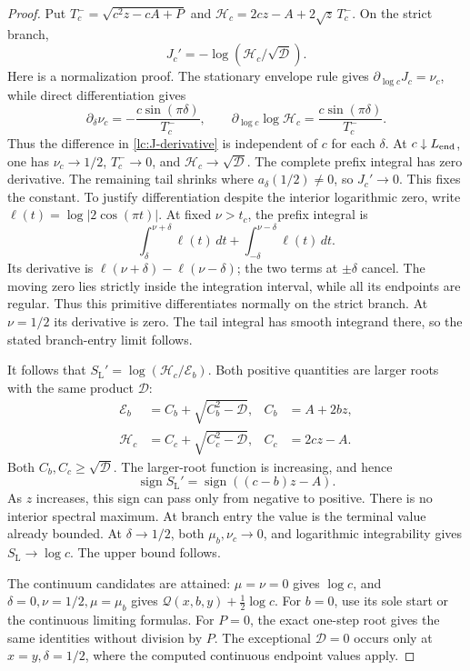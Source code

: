\documentclass[11pt]{article}
\numberwithin{equation}{section}
\theoremstyle{remark}\newtheorem{remark}[theorem]{Remark}
\begin{document}
\begin{proof}
Put \(T_c^-=\sqrt{c^2z-cA+P}\) and
\(\mathcal H_c=2cz-A+2\sqrt z\,T_c^-\). On the strict branch,
\begin{equation}\label{lc:J-derivative}
                  J_c'=-\log(\mathcal H_c/\sqrt{\mathcal D}).
\end{equation}
Here is a normalization proof. The stationary envelope rule gives
\(\partial_{\log c}J_c=\nu_c\), while direct differentiation gives
\[
 \partial_\delta\nu_c=-\frac{c\sin(\pi\delta)}{T_c^-},\qquad
 \partial_{\log c}\log\mathcal H_c=
                         \frac{c\sin(\pi\delta)}{T_c^-}.
\]
Thus the difference in \eqref{lc:J-derivative} is independent of
\(c\) for each \(\delta\). At \(c\downarrow L_{\rm end}\), one has
\(\nu_c\to1/2\), \(T_c^-\to0\), and \(\mathcal H_c\to\sqrt{\mathcal D}\).
The complete prefix integral has zero derivative. The remaining
tail shrinks where \(a_\delta(1/2)\ne0\), so \(J_c'\to0\).
This fixes the constant. To justify differentiation despite the
interior logarithmic zero, write \(\ell(t)=\log|2\cos(\pi t)|\).
At fixed \(\nu>t_c\), the prefix integral is
\[
 \int_\delta^{\nu+\delta}\ell(t)\,dt+
 \int_{-\delta}^{\nu-\delta}\ell(t)\,dt.
\]
Its derivative is
\(\ell(\nu+\delta)-\ell(\nu-\delta)\); the two terms at
\(\pm\delta\) cancel. The moving zero lies strictly inside the
integration interval, while all its endpoints are regular.
Thus this primitive differentiates normally on the strict branch.
At \(\nu=1/2\) its derivative is zero. The tail integral has
smooth integrand there, so the stated branch-entry limit follows.

It follows that \(S_{\mathrm L}'=\log(\mathcal H_c/\mathcal E_b)\).
Both positive quantities are larger roots with the same product
\(\mathcal D\):
\[
\begin{aligned}
 \mathcal E_b&=C_b+\sqrt{C_b^2-\mathcal D},&C_b&=A+2bz,\\
 \mathcal H_c&=C_c+\sqrt{C_c^2-\mathcal D},&C_c&=2cz-A.
\end{aligned}
\]
Both \(C_b,C_c\ge\sqrt{\mathcal D}\). The larger-root function is
increasing, and hence
\[
             \operatorname{sign}S_{\mathrm L}'
                      =\operatorname{sign}((c-b)z-A).
\]
As \(z\) increases, this sign can pass only from negative to positive.
There is no interior spectral maximum. At branch entry the value
is the terminal value already bounded. At \(\delta\to1/2\), both
\(\mu_b,\nu_c\to0\), and logarithmic integrability gives
\(S_{\mathrm L}\to\log c\). The upper bound follows.

The continuum candidates are attained: \(\mu=\nu=0\) gives \(\log c\),
and \(\delta=0,\nu=1/2,\mu=\mu_b\) gives
\(\mathcal Q(x,b,y)+\frac12\log c\).
For \(b=0\), use its sole start or the continuous limiting formulas.
For \(P=0\), the exact one-step root gives the same identities
without division by \(P\). The exceptional \(\mathcal D=0\) occurs
only at \(x=y,\delta=1/2\), where the computed continuous endpoint
values apply.
\end{proof}
\end{document}
